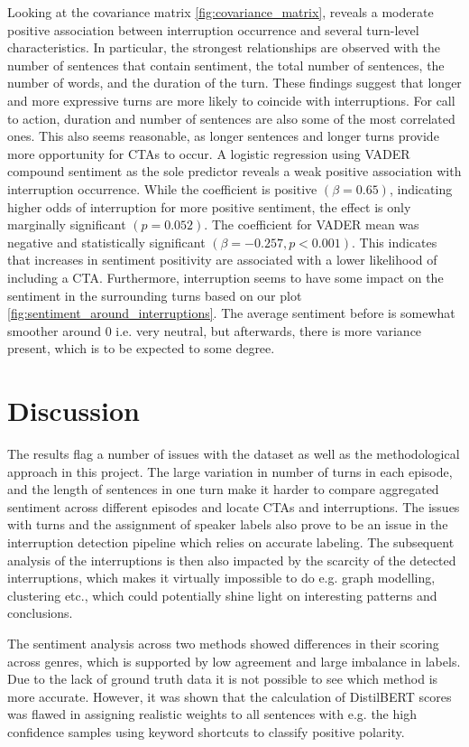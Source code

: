 \documentclass{article}
\begin{document}
Looking at the covariance matrix \ref{fig:covariance_matrix}, reveals a moderate positive association between interruption occurrence and several turn-level characteristics. In particular, the strongest relationships are observed with the number of sentences that contain sentiment, the total number of sentences, the number of words, and the duration of the turn. These findings suggest that longer and more expressive turns are more likely to coincide with interruptions. For call to action, duration and number of sentences are also some of the most correlated ones. This also seems reasonable, as longer sentences and longer turns provide more opportunity for CTAs to occur. A logistic regression using VADER compound sentiment as the sole predictor reveals a weak positive association with interruption occurrence. While the coefficient is positive $(\beta = 0.65)$, indicating higher odds of interruption for more positive sentiment, the effect is only marginally significant $(p = 0.052)$. The coefficient for VADER mean was negative and statistically significant $(\beta = -0.257, p < 0.001)$. This indicates that increases in sentiment positivity are associated with a lower likelihood of including a CTA. Furthermore, interruption seems to have some impact on the sentiment in the surrounding turns based on our plot \ref{fig:sentiment_around_interruptions}. The average sentiment before is somewhat smoother around $0$ i.e. very neutral, but afterwards, there is more variance present, which is to be expected to some degree.

\section{Discussion}
The results flag a number of issues with the dataset as well as the methodological approach in this project. The large variation in number of turns in each episode, and the length of sentences in one turn make it harder to compare aggregated sentiment across different episodes and locate CTAs and interruptions. The issues with turns and the assignment of speaker labels also prove to be an issue in the interruption detection pipeline which relies on accurate labeling. The subsequent analysis of the interruptions is then also impacted by the scarcity of the detected interruptions, which makes it virtually impossible to do e.g. graph modelling, clustering etc., which could potentially shine light on interesting patterns and conclusions. 

The sentiment analysis across two methods showed differences in their scoring across genres, which is supported by low agreement and large imbalance in labels. Due to the lack of ground truth data it is not possible to see which method is more accurate. However, it was shown that the calculation of DistilBERT scores was flawed in assigning realistic weights to all sentences with e.g. the high confidence samples using keyword shortcuts to classify positive polarity.
\end{document}
